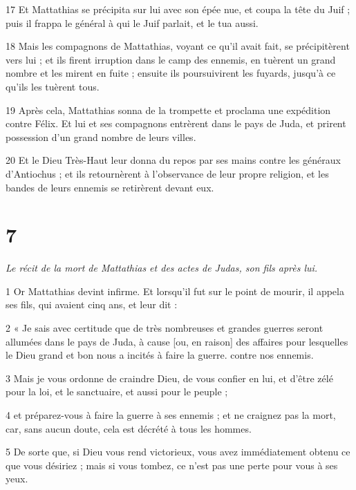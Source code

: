 \par 17 Et Mattathias se précipita sur lui avec son épée nue, et coupa la tête du Juif ; puis il frappa le général à qui le Juif parlait, et le tua aussi.

\par 18 Mais les compagnons de Mattathias, voyant ce qu'il avait fait, se précipitèrent vers lui ; et ils firent irruption dans le camp des ennemis, en tuèrent un grand nombre et les mirent en fuite ; ensuite ils poursuivirent les fuyards, jusqu'à ce qu'ils les tuèrent tous.

\par 19 Après cela, Mattathias sonna de la trompette et proclama une expédition contre Félix. Et lui et ses compagnons entrèrent dans le pays de Juda, et prirent possession d'un grand nombre de leurs villes.

\par 20 Et le Dieu Très-Haut leur donna du repos par ses mains contre les généraux d'Antiochus ; et ils retournèrent à l'observance de leur propre religion, et les bandes de leurs ennemis se retirèrent devant eux.

\chapter{7}

\par \textit{Le récit de la mort de Mattathias et des actes de Judas, son fils après lui.}

\par 1 Or Mattathias devint infirme. Et lorsqu'il fut sur le point de mourir, il appela ses fils, qui avaient cinq ans, et leur dit :

\par 2 « Je sais avec certitude que de très nombreuses et grandes guerres seront allumées dans le pays de Juda, à cause [ou, en raison] des affaires pour lesquelles le Dieu grand et bon nous a incités à faire la guerre. contre nos ennemis.

\par 3 Mais je vous ordonne de craindre Dieu, de vous confier en lui, et d'être zélé pour la loi, et le sanctuaire, et aussi pour le peuple ;

\par 4 et préparez-vous à faire la guerre à ses ennemis ; et ne craignez pas la mort, car, sans aucun doute, cela est décrété à tous les hommes.

\par 5 De sorte que, si Dieu vous rend victorieux, vous avez immédiatement obtenu ce que vous désiriez ; mais si vous tombez, ce n'est pas une perte pour vous à ses yeux.

